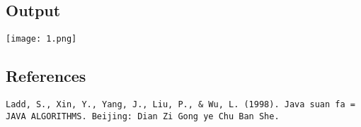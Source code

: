 \documentclass[12pt,a4paper]{article}
\begin{document}
\begin{flushleft}
\subsection{Output}
\texttt{[image: 1.png]}

\subsection{References}
\texttt{Ladd, S., Xin, Y., Yang, J., Liu, P., \& Wu, L. (1998). Java suan fa = JAVA ALGORITHMS. Beijing: Dian Zi Gong ye Chu Ban She.}

\end{flushleft}
\end{document}
